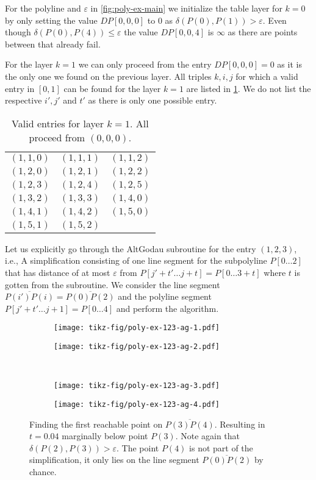 For the polyline and \(\varepsilon\) in \cref{fig:poly-ex-main} we initialize the table layer for \(k = 0\) by only setting the value \(DP[0,0,0]\) to \(0\) as \(\delta(P(0), P(1)) > \varepsilon\). Even though \(\delta(P(0), P(4)) \leq \varepsilon\) the value \(DP[0,0,4]\) is \(\infty\) as there are points between that already fail.

For the layer \(k = 1\) we can only proceed from the entry \(DP[0,0,0] = 0\) as it is the only one we found on the previous layer. All triples \(k, i, j\) for which a valid entry in \([0, 1]\) can be found for the layer \(k = 1\) are listed in \cref{tab:exlayer1}. We do not list the respective \(i', j'\) and \(t'\) as there is only one possible entry.
\begin{table}[ht]
\centering
\begin{tabular}{|ccc|}
\hline
$(1,1,0)$ & $(1,1,1)$ & $(1,1,2)$ \\
$(1,2,0)$ & $(1,2,1)$ & $(1,2,2)$ \\
$(1,2,3)$ & $(1,2,4)$ & $(1,2,5)$ \\
$(1,3,2)$ & $(1,3,3)$ & $(1,4,0)$ \\
$(1,4,1)$ & $(1,4,2)$ & $(1,5,0)$ \\
$(1,5,1)$ & $(1,5,2)$ & \\
\hline
\end{tabular}
\caption{Valid entries for layer \(k = 1\). All proceed from \((0,0,0)\).}
\label{tab:exlayer1}
\end{table}

Let us explicitly go through the AltGodau subroutine for the entry \((1, 2, 3)\), i.e., A simplification consisting of one line segment for the subpolyline \(P[0\dots 2]\) that has distance of at most \(\varepsilon\) from \(P[j' + t'\dots j + t] = P[0 \dots 3 + t]\) where \(t\) is gotten from the subroutine. We consider the line segment \(\overline{P(i')P(i)} = \overline{P(0)P(2)}\) and the polyline segment \(P[j' + t' \dots j + 1] = P[0 \dots 4]\) and perform the algorithm. 

\begin{figure}
  \centering
  \begin{subfigure}[b]{0.4\textwidth}
    \texttt{[image: tikz-fig/poly-ex-123-ag-1.pdf]}
  \end{subfigure}
  \begin{subfigure}[b]{0.4\textwidth}
    \texttt{[image: tikz-fig/poly-ex-123-ag-2.pdf]}
  \end{subfigure}\\
  \begin{subfigure}[b]{0.4\textwidth}
    \texttt{[image: tikz-fig/poly-ex-123-ag-3.pdf]}
  \end{subfigure}
  \begin{subfigure}[b]{0.4\textwidth}
    \texttt{[image: tikz-fig/poly-ex-123-ag-4.pdf]}
  \end{subfigure}
  \caption{Finding the first reachable point on \(\overline{P(3)P(4)}\). Resulting in \(t = 0.04\) marginally below point \(P(3)\). Note again that \(\delta(P(2), P(3)) > \varepsilon\). The point \(P(4)\) is not part of the simplification, it only lies on the line segment \(\overline{P(0)P(2)}\) by chance.}
  \label{fig:poly-ex-123-ag}
\end{figure}

